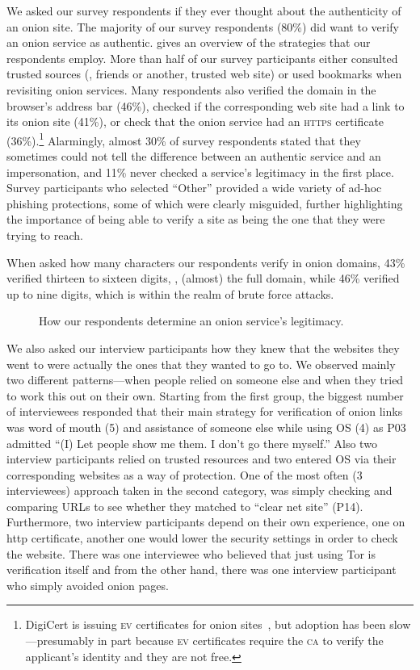 We asked our survey respondents if they ever thought about the authenticity of
an onion site.  The majority of our survey respondents (80\%) did want to verify
an onion service as authentic.   gives an
overview of the strategies that our respondents employ.  More than half of our
survey participants either consulted trusted sources (\eg, friends or another,
trusted web site) or used bookmarks when revisiting onion services.  Many
respondents also verified the domain in the browser's address bar (46\%),
checked if the corresponding web site had a link to its onion site (41\%), or
check that the onion service had an \textsc{https} certificate
(36\%).\footnote{DigiCert is issuing \textsc{ev} certificates for onion
sites~\cite{DigiCert2015a}, but adoption has been slow---presumably in part
because \textsc{ev} certificates require the \textsc{ca} to verify the
applicant's identity and they are not free.}  Alarmingly, almost 30\% of survey
respondents stated that they sometimes could not tell the difference between an
authentic service and an impersonation, and 11\% never checked a service's
legitimacy in the first place.  Survey participants who selected ``Other''
provided a wide variety of ad-hoc phishing protections, some of which were
clearly misguided,  further
highlighting the importance of being able to verify a site as being the one that
they were trying to reach.

When asked how many characters our respondents verify in onion domains,  43\%
verified thirteen to sixteen digits, \ie, (almost) the full domain, while 46\%
verified up to nine digits, which is within the realm of brute force attacks.

\begin{figure}[t]
    \centering
    
    \caption{How our respondents determine an onion service's legitimacy.}
    \label{fig:determining-legitimacy}
\end{figure}


We also asked our interview participants how they knew that the websites they
went to were actually the ones that they wanted to go to.  We observed mainly
two different patterns---when people relied on someone else and when they tried
to work this out on their own. Starting from the first group, the biggest number
of interviewees responded that their main strategy for verification of onion
links was word of mouth (5) and assistance of someone else while using OS (4) as
P03 admitted ``(I) Let people show me them. I don't go there myself.''  Also two
interview participants relied on trusted resources and two entered OS via their
corresponding websites as a way of protection. One of the most often (3
interviewees) approach taken in the second category, was simply checking and
comparing URLs to see whether they matched to ``clear net site'' (P14).
Furthermore, two interview participants depend on their own experience, one on
http certificate, another one would lower the security settings in order to
check the website. There was one interviewee who believed that just using Tor is
verification itself and from the other hand, there was one interview participant
who simply avoided onion pages.

